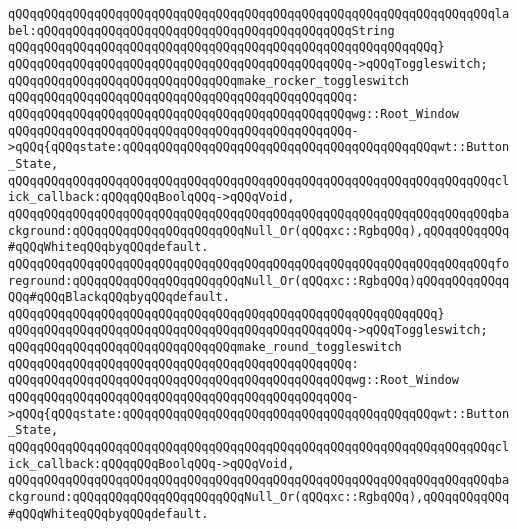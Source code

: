 \verb|qQQqqQQqqQQqqQQqqQQqqQQqqQQqqQQqqQQqqQQqqQQqqQQqqQQqqQQqqQQqqQQqqQQqlabel:qQQqqQQqqQQqqQQqqQQqqQQqqQQqqQQqqQQqqQQqqQQqString|\newline
\verb|qQQqqQQqqQQqqQQqqQQqqQQqqQQqqQQqqQQqqQQqqQQqqQQqqQQqqQQqqQQq}|\newline
\verb|qQQqqQQqqQQqqQQqqQQqqQQqqQQqqQQqqQQqqQQqqQQqqQQq->qQQqToggleswitch;|\newline
\newline
\verb|qQQqqQQqqQQqqQQqqQQqqQQqqQQqqQQqmake_rocker_toggleswitch|\newline
\verb|qQQqqQQqqQQqqQQqqQQqqQQqqQQqqQQqqQQqqQQqqQQqqQQq:|\newline
\verb|qQQqqQQqqQQqqQQqqQQqqQQqqQQqqQQqqQQqqQQqqQQqqQQqwg::Root_Window|\newline
\verb|qQQqqQQqqQQqqQQqqQQqqQQqqQQqqQQqqQQqqQQqqQQqqQQq->qQQq{qQQqstate:qQQqqQQqqQQqqQQqqQQqqQQqqQQqqQQqqQQqqQQqqQQqwt::Button_State,|\newline
\verb|qQQqqQQqqQQqqQQqqQQqqQQqqQQqqQQqqQQqqQQqqQQqqQQqqQQqqQQqqQQqqQQqqQQqclick_callback:qQQqqQQqBoolqQQq->qQQqVoid,|\newline
\verb|qQQqqQQqqQQqqQQqqQQqqQQqqQQqqQQqqQQqqQQqqQQqqQQqqQQqqQQqqQQqqQQqqQQqbackground:qQQqqQQqqQQqqQQqqQQqqQQqNull_Or(qQQqxc::RgbqQQq),qQQqqQQqqQQq#qQQqWhiteqQQqbyqQQqdefault.|\newline
\verb|qQQqqQQqqQQqqQQqqQQqqQQqqQQqqQQqqQQqqQQqqQQqqQQqqQQqqQQqqQQqqQQqqQQqforeground:qQQqqQQqqQQqqQQqqQQqqQQqNull_Or(qQQqxc::RgbqQQq)qQQqqQQqqQQqqQQq#qQQqBlackqQQqbyqQQqdefault.|\newline
\verb|qQQqqQQqqQQqqQQqqQQqqQQqqQQqqQQqqQQqqQQqqQQqqQQqqQQqqQQqqQQq}|\newline
\verb|qQQqqQQqqQQqqQQqqQQqqQQqqQQqqQQqqQQqqQQqqQQqqQQq->qQQqToggleswitch;|\newline
\newline
\verb|qQQqqQQqqQQqqQQqqQQqqQQqqQQqqQQqmake_round_toggleswitch|\newline
\verb|qQQqqQQqqQQqqQQqqQQqqQQqqQQqqQQqqQQqqQQqqQQqqQQq:|\newline
\verb|qQQqqQQqqQQqqQQqqQQqqQQqqQQqqQQqqQQqqQQqqQQqqQQqwg::Root_Window|\newline
\verb|qQQqqQQqqQQqqQQqqQQqqQQqqQQqqQQqqQQqqQQqqQQqqQQq->qQQq{qQQqstate:qQQqqQQqqQQqqQQqqQQqqQQqqQQqqQQqqQQqqQQqqQQqwt::Button_State,|\newline
\verb|qQQqqQQqqQQqqQQqqQQqqQQqqQQqqQQqqQQqqQQqqQQqqQQqqQQqqQQqqQQqqQQqqQQqclick_callback:qQQqqQQqBoolqQQq->qQQqVoid,|\newline
\verb|qQQqqQQqqQQqqQQqqQQqqQQqqQQqqQQqqQQqqQQqqQQqqQQqqQQqqQQqqQQqqQQqqQQqbackground:qQQqqQQqqQQqqQQqqQQqqQQqNull_Or(qQQqxc::RgbqQQq),qQQqqQQqqQQq#qQQqWhiteqQQqbyqQQqdefault.|\newline
